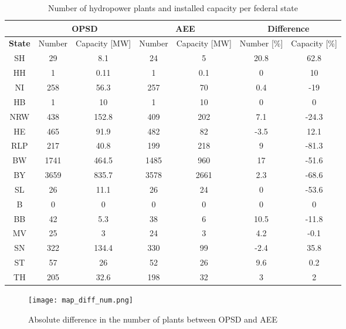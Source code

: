 \begin{table}[H]
\footnotesize 
 \centering
 \caption[Number of hydropower plants and installed capacity per federal state]{Number of hydropower plants and installed capacity per federal state}
 \label{oedb_aee_diff}
 \begin{tabular}{|c|cc|cc| cc|}
  \cline{2-7}
  \multicolumn{0}{c|}{} &\multicolumn{2}{c}{\textbf{OPSD \cite{oedb}}}&\multicolumn{2}{|c|}{\textbf{AEE \cite{aee}}}&\multicolumn{2}{c|}{\textbf{Difference}} \\
  \hline
  \textbf{State} & Number 	& 	Capacity [\unit{MW}] 	&	Number 	& 	Capacity [\unit{MW}] 	&	Number [\unit{\%}] 	&	Capacity [\unit{\%}] \\
  \hline
  SH	&	29	&	8.1		&	24	&	5		&	20.8		&	62.8	\\
  HH	&	1	&	0.11		&	1	&	0.1		&	0		&	10	\\
  NI	&	258	&	56.3		&	257	&	70		&	0.4		&	-19	\\
  HB	&	1	&	10		&	1	&	10		&	0		&	0	\\
  NRW	&	438	&	152.8		&	409	&	202		&	7.1		&	-24.3	\\
  HE	&	465	&	91.9		&	482	&	82		&	-3.5		&	12.1	\\
  RLP	&	217	&	40.8		&	199	&	218		&	9		&	-81.3	\\
  BW	&	1741	&	464.5		&	1485	&	960		&	17		&	-51.6	\\	
  BY	&	3659	&	835.7		&	3578	&	2661		&	2.3		&	-68.6	\\
  SL	&	26	&	11.1		&	26	&	24		&	0		&	-53.6	\\
  B	&	0	&	0		&	0	&	0		&	0		&	0	\\
  BB	&	42	&	5.3		&	38	&	6		&	10.5		&	-11.8	\\
  MV	&	25	&	3		&	24	&	3		&	4.2		&	-0.1	\\
  SN	&	322	&	134.4		&	330	&	99		&	-2.4		&	35.8	\\
  ST	&	57	&	26		&	52	&	26		&	9.6		&	0.2	\\
  TH	&	205	&	32.6		&	198	&	32		&	3		&	2	\\
  \hline
 \end{tabular} 
\end{table}


\begin{figure}[H]
\centering
\texttt{[image: map\_diff\_num.png]}
\caption[Absolute difference in the number of plants between OPSD and AEE]{Absolute difference in the number of plants between OPSD and AEE}
\label{map_diff_num}
\end{figure}


